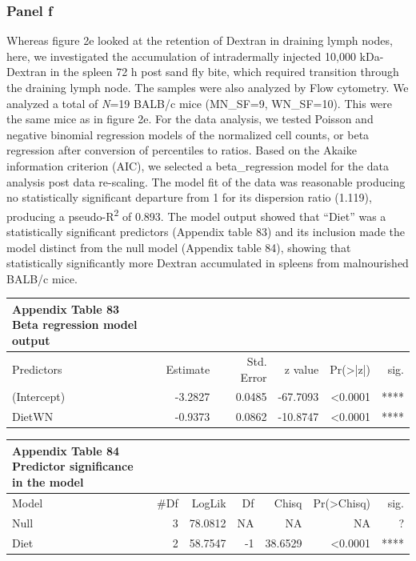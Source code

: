 \documentclass[
  12pt,
  letterpaper,
]{article}
\begin{document}
\subsubsection{Panel f}\label{panel-f}

Whereas figure 2e looked at the retention of Dextran in draining lymph nodes, here, we investigated the accumulation of intradermally injected 10,000 kDa-Dextran in the spleen 72 h post sand fly bite, which required transition through the draining lymph node. The samples were also analyzed by Flow cytometry. We analyzed a total of \emph{N}=19 BALB/c mice (MN\_SF=9, WN\_SF=10). This were the same mice as in figure 2e. For the data analysis, we tested Poisson and negative binomial regression models of the normalized cell counts, or beta regression after conversion of percentiles to ratios. Based on the Akaike information criterion (AIC), we selected a beta\_regression model for the data analysis post data re-scaling. The model fit of the data was reasonable producing no statistically significant departure from 1 for its dispersion ratio (1.119), producing a pseudo-R\textsuperscript{2} of 0.893. The model output showed that ``Diet'' was a statistically significant predictors (Appendix table 83) and its inclusion made the model distinct from the null model (Appendix table 84), showing that statistically significantly more Dextran accumulated in spleens from malnourished BALB/c mice.

\begingroup
\fontsize{12.0pt}{14.4pt}\selectfont
\begin{longtable}{l|rrrrr}
\caption*{
{\large \textbf{Appendix Table 83}} \\ 
{\small \textbf{Beta regression model output}}
} \\ 
\toprule
Predictors & {Estimate} & {Std. Error} & {z value} & {Pr(>|z|)} & {sig.} \\ 
\midrule\addlinespace[2.5pt]
(Intercept) & -3.2827 & 0.0485 & -67.7093 & <0.0001 & **** \\ 
DietWN & -0.9373 & 0.0862 & -10.8747 & <0.0001 & **** \\ 
\bottomrule
\end{longtable}
\endgroup

\begingroup
\fontsize{12.0pt}{14.4pt}\selectfont
\begin{longtable}{l|rrrrrr}
\caption*{
{\large \textbf{Appendix Table 84}} \\ 
{\small \textbf{Predictor significance in the model}}
} \\ 
\toprule
Model & \#Df & {LogLik} & {Df} & {Chisq} & {Pr(>Chisq)} & {sig.} \\ 
\midrule\addlinespace[2.5pt]
Null & 3 & 78.0812 & NA & NA & NA & ? \\ 
Diet & 2 & 58.7547 & -1 & 38.6529 & <0.0001 & **** \\ 
\bottomrule
\end{longtable}
\endgroup
\end{document}
